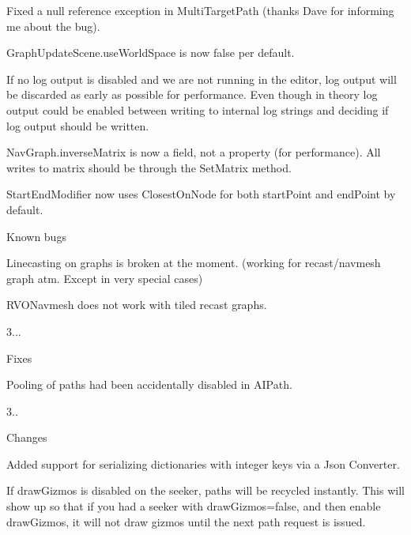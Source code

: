 \begin{DoxyItemize}
\begin{DoxyItemize}
\begin{DoxyItemize}
\item Fixed a null reference exception in Multi\+Target\+Path (thanks Dave for informing me about the bug).
\item Graph\+Update\+Scene.\+use\+World\+Space is now false per default.
\item If no log output is disabled and we are not running in the editor, log output will be discarded as early as possible for performance. Even though in theory log output could be enabled between writing to internal log strings and deciding if log output should be written.
\item Nav\+Graph.\+inverse\+Matrix is now a field, not a property (for performance). All writes to matrix should be through the Set\+Matrix method.
\item Start\+End\+Modifier now uses Closest\+On\+Node for both start\+Point and end\+Point by default.
\end{DoxyItemize}
\item Known bugs
\begin{DoxyItemize}
\item Linecasting on graphs is broken at the moment. (working for recast/navmesh graph atm. Except in very special cases)
\item R\+V\+O\+Navmesh does not work with tiled recast graphs.
\end{DoxyItemize}
\end{DoxyItemize}
\item 3...
\begin{DoxyItemize}
\item Fixes
\begin{DoxyItemize}
\item Pooling of paths had been accidentally disabled in A\+I\+Path.
\end{DoxyItemize}
\end{DoxyItemize}
\item 3..
\begin{DoxyItemize}
\item Changes
\begin{DoxyItemize}
\item Added support for serializing dictionaries with integer keys via a Json Converter.
\item If draw\+Gizmos is disabled on the seeker, paths will be recycled instantly. This will show up so that if you had a seeker with draw\+Gizmos=false, and then enable draw\+Gizmos, it will not draw gizmos until the next path request is issued.
\end{DoxyItemize}

\end{DoxyItemize}
\end{DoxyItemize}
